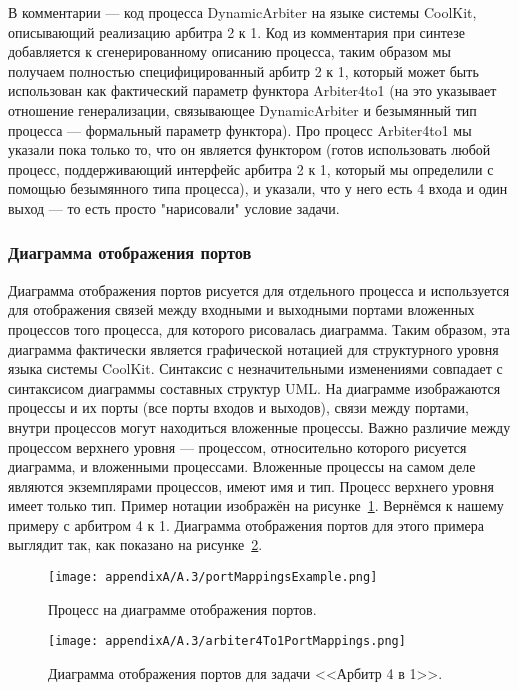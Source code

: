 В комментарии --- код процесса DynamicArbiter на языке системы CoolKit, описывающий 
реализацию арбитра 2 к 1. Код из комментария при синтезе добавляется к сгенерированному 
описанию процесса, таким образом мы получаем полностью специфицированный арбитр 2 к 1, 
который может быть использован как фактический параметр функтора Arbiter4to1 (на это 
указывает отношение генерализации, связывающее DynamicArbiter и безымянный тип процесса --- 
формальный параметр функтора). Про процесс Arbiter4to1 мы указали пока только то, 
что он является функтором (готов использовать любой процесс, поддерживающий интерфейс 
арбитра 2 к 1, который мы определили с помощью безымянного типа процесса), и указали, 
что у него есть 4 входа и один выход --- то есть просто "нарисовали" условие задачи.

\subsubsection{Диаграмма отображения портов}
Диаграмма отображения портов рисуется для отдельного процесса и используется для отображения 
связей между входными и выходными портами вложенных процессов того процесса, для которого 
рисовалась диаграмма. Таким образом, эта диаграмма фактически является графической 
нотацией для структурного уровня языка системы CoolKit. Синтаксис с незначительными 
изменениями совпадает с синтаксисом диаграммы составных структур UML. На диаграмме 
изображаются процессы и их порты (все порты входов и выходов), связи между портами, 
внутри процессов могут находиться вложенные процессы. Важно различие между процессом 
верхнего уровня --- процессом, относительно которого рисуется диаграмма, и вложенными 
процессами. Вложенные процессы на самом деле являются экземплярами процессов, имеют 
имя и тип. Процесс верхнего уровня имеет только тип. Пример нотации изображён на рисунке~\ref{image:portMappingsExample}. 
Вернёмся к нашему примеру с арбитром 4 к 1. Диаграмма отображения портов для этого примера 
выглядит так, как показано на рисунке~\ref{image:arbiter4To1PortMappings}.

\begin{figure} [ht]
	\begin{center}
		\texttt{[image: appendixA/A.3/portMappingsExample.png]}
		\caption{Процесс на диаграмме отображения портов.}
		\label{image:portMappingsExample}
	\end{center}
\end{figure}

\begin{figure} [ht]
	\begin{center}
		\texttt{[image: appendixA/A.3/arbiter4To1PortMappings.png]}
		\caption{Диаграмма отображения портов для задачи <<Арбитр 4 в 1>>.}
		\label{image:arbiter4To1PortMappings}
	\end{center}
\end{figure}

